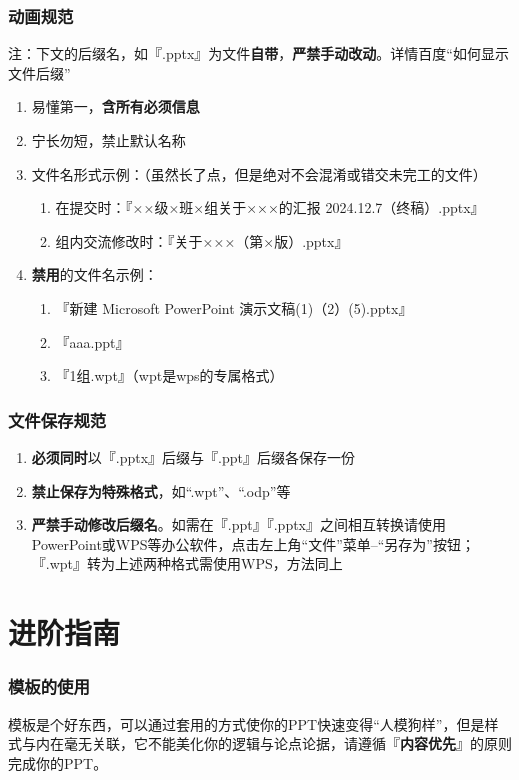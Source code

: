 \section[动画规范]{动画规范}
注：下文的后缀名，如『.pptx』为文件\textbf{自带}，\textbf{严禁手动改动}。详情百度“如何显示文件后缀”
\begin{enumerate}
    \item 易懂第一，\textbf{含所有必须信息}
    \item 宁长勿短，禁止默认名称
    \item 文件名形式示例：（虽然长了点，但是绝对不会混淆或错交未完工的文件）
          \begin{enumerate}
              \item 在提交时：『××级×班×组关于×××的汇报 2024.12.7（终稿）.pptx』
              \item 组内交流修改时：『关于×××（第×版）.pptx』
          \end{enumerate}
    \item \textbf{禁用}的文件名示例：
          \begin{enumerate}
              \item 『新建 Microsoft PowerPoint 演示文稿(1)（2）(5).pptx』
              \item 『aaa.ppt』
              \item 『1组.wpt』（wpt是wps的专属格式）
          \end{enumerate}
\end{enumerate}

\section[文件保存规范]{文件保存规范}
\begin{enumerate}
    \item \textbf{必须同时}以『.pptx』后缀与『.ppt』后缀各保存一份
    \item \textbf{禁止保存为特殊格式}，如“.wpt”、“.odp”等
    \item \textbf{严禁手动修改后缀名}。如需在『.ppt』『.pptx』之间相互转换请使用PowerPoint或WPS等办公软件，点击左上角“文件”菜单--“另存为”按钮；『.wpt』转为上述两种格式需使用WPS，方法同上
\end{enumerate}

\part[进阶指南]{进阶指南}
\section[模板的使用]{模板的使用}
模板是个好东西，可以通过套用的方式使你的PPT快速变得“人模狗样”，但是样式与内在毫无关联，它不能美化你的逻辑与论点论据，请遵循『\textbf{内容优先}』的原则完成你的PPT。

